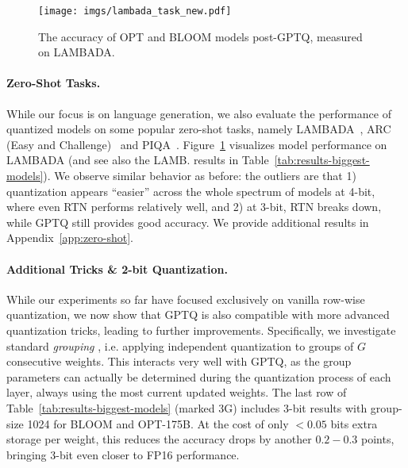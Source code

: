 \begin{figure}[h]
        \centering
        \texttt{[image: imgs/lambada\_task\_new.pdf]}
    \vspace{-3pt}
    \caption{The accuracy of OPT and BLOOM models post-GPTQ, measured on LAMBADA.}
    \label{fig:lambada_task}
\end{figure}

\paragraph{Zero-Shot Tasks.} While our focus is on language generation, we also evaluate the performance of quantized models on some popular zero-shot tasks, namely LAMBADA~\cite{paperno2016lambada}, ARC (Easy and Challenge)~\cite{boratko2018systematic} and  PIQA~\cite{tata2003piqa}. 
Figure~\ref{fig:lambada_task} visualizes model performance on LAMBADA (and see also the LAMB. results in Table~\ref{tab:results-biggest-models}). 
We observe similar behavior as before: the outliers are that 1) quantization appears ``easier'' across the whole spectrum of models at 4-bit, where even RTN performs relatively well, and 2) at 3-bit, RTN breaks down, while GPTQ still provides good accuracy. We provide additional results in Appendix~\ref{app:zero-shot}.

\paragraph{Additional Tricks \& 2-bit Quantization.} While our experiments so far have focused exclusively on vanilla row-wise quantization, we now show that GPTQ is also compatible with more advanced quantization tricks, leading to further improvements. Specifically, we investigate standard \textit{grouping} \cite{alistarh2016qsgd, park2022nuqmm}, i.e. applying independent quantization to groups of $G$ consecutive weights. This interacts very well with GPTQ, as the group parameters can actually be determined during the quantization process of each layer, always using the most current updated weights. The last row of Table~\ref{tab:results-biggest-models} (marked 3G) includes 3-bit results with group-size 1024 for BLOOM and OPT-175B. At the cost of only $< 0.05$ bits extra storage per weight, this reduces the accuracy drops by another $0.2 - 0.3$ points, bringing 3-bit even closer to FP16 performance.

